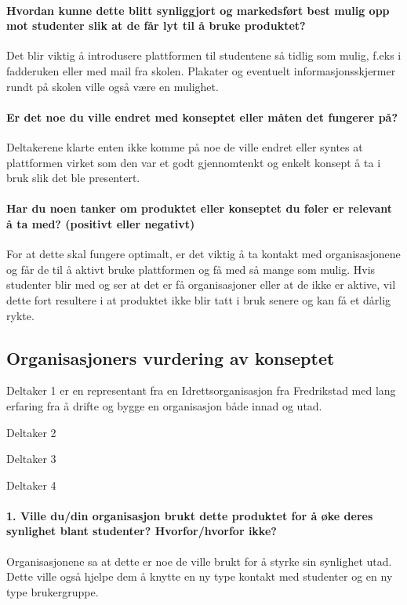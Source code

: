 \paragraph{Hvordan kunne dette blitt synliggjort og markedsført best mulig opp mot studenter slik at de får lyt til å bruke produktet?} Det blir viktig å introdusere plattformen til studentene så tidlig som mulig, f.eks i fadderuken eller med mail fra skolen. Plakater og eventuelt informasjonsskjermer rundt på skolen ville også være en mulighet.

\paragraph{Er det noe du ville endret med konseptet eller måten det fungerer på?} Deltakerene klarte enten ikke komme på noe de ville endret eller syntes at plattformen virket som den var et godt gjennomtenkt og enkelt konsept å ta i bruk slik det ble presentert.

\paragraph{Har du noen tanker om produktet eller konseptet du føler er relevant å ta med? (positivt eller negativt)}
For at dette skal fungere optimalt, er det viktig å ta kontakt med organisasjonene og får de til å aktivt bruke plattformen og få med så mange som mulig. Hvis studenter blir med og ser at det er få organisasjoner eller at de ikke er aktive, vil dette fort resultere i at produktet ikke blir tatt i bruk senere og kan få et dårlig rykte. 


\subsection{Organisasjoners vurdering av konseptet}

Deltaker 1 er en representant fra en Idrettsorganisasjon fra Fredrikstad med lang erfaring fra å drifte og bygge en organisasjon både innad og utad.

Deltaker 2

Deltaker 3

Deltaker 4

\paragraph{1. Ville du/din organisasjon brukt dette produktet for å øke deres synlighet blant studenter? Hvorfor/hvorfor ikke?}
Organisasjonene sa at dette er noe de ville brukt for å styrke sin synlighet utad. Dette ville også hjelpe dem å knytte en ny type kontakt med studenter og en ny type brukergruppe.

